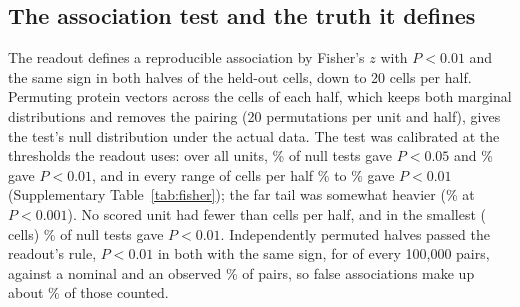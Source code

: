 \begin{table}[h]
\caption{\textbf{Named within-type relationships with 100 paired cells.} Programs: interferon-stimulated (R1: ISG15, IFI6, IFI44L, MX1, OAS1, OAS2, HERC5, XAF1, EPSTI1, IFITM3, STAT2, IRF9), MHC class II (R2, R3: HLA-DRA, HLA-DRB1, HLA-DRB5, HLA-DQA1, HLA-DQB1, HLA-DPA1, HLA-DPB1, HLA-DMA, HLA-DMB), cytotoxic in CD8 T cells (R4, R5: GZMB, GZMH, PRF1, GNLY, NKG7, FGFBP2, CST7, KLRD1, ADGRG1) and in NK cells (R6, R7: GZMB, PRF1, FGFBP2, SPON2, GNLY, NKG7), and LEF1 (R8); expected signs positive except R5 and R7. Units, held-out samples in which the cell type was scored; held-out $r$, the mean over units of the relationship's value; recovered, the fraction of the relationship recovered by the estimator with the atlas (Est.), reference regression with the atlas (Regr.) and paired-only estimation (Paired), each comparator in its best form for the relationship; correct sign, among units whose two halves agreed in sign; donors, the number of donors in which the estimator's absolute error was lower, of all donors with the cell type scored.}
\label{tab:relationships}
\centering\scriptsize

\end{table}

\subsection*{The association test and the truth it defines}
The readout defines a reproducible association by Fisher's $z$ with $P<0.01$ and the same sign in both halves of the held-out cells, down to 20 cells per half. Permuting protein vectors across the cells of each half, which keeps both marginal distributions and removes the pairing (20 permutations per unit and half), gives the test's null distribution under the actual data. The test was calibrated at the thresholds the readout uses: over all \RvFisherUnits{} units, \RvFisherFive\% of null tests gave $P<0.05$ and \RvFisherOne\% gave $P<0.01$, and in every range of cells per half \RvFisherOneMin\% to \RvFisherOneMax\% gave $P<0.01$ (Supplementary Table~\ref{tab:fisher}); the far tail was somewhat heavier (\RvFisherTenth\% at $P<0.001$). No scored unit had fewer than \RvFisherSmallLo{} cells per half, and in the smallest (\RvFisherSmallRange{} cells) \RvFisherSmallOne\% of null tests gave $P<0.01$. Independently permuted halves passed the readout's rule, $P<0.01$ in both with the same sign, for \RvReplNull{} of every 100,000 pairs, against a nominal \RvReplNominal{} and an observed \RvReplObserved\% of pairs, so false associations make up about \RvReplFalseShare\% of those counted.

